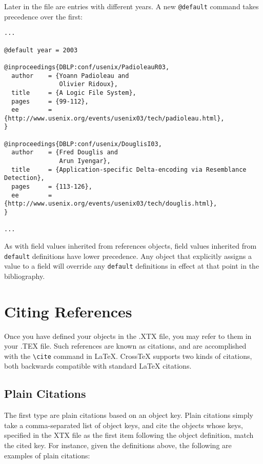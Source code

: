 \documentclass{article}
\newcommand{\XTeX}{Cross\TeX}
\begin{document}
Later in the file are entries with different years. A new \texttt{@default} command takes precedence over the first:

\begin{small}\begin{verbatim}
...

@default year = 2003

@inproceedings{DBLP:conf/usenix/PadioleauR03,
  author    = {Yoann Padioleau and
               Olivier Ridoux},
  title     = {A Logic File System},
  pages     = {99-112},
  ee        = {http://www.usenix.org/events/usenix03/tech/padioleau.html},
}

@inproceedings{DBLP:conf/usenix/DouglisI03,
  author    = {Fred Douglis and
               Arun Iyengar},
  title     = {Application-specific Delta-encoding via Resemblance Detection},
  pages     = {113-126},
  ee        = {http://www.usenix.org/events/usenix03/tech/douglis.html},
}

...
\end{verbatim}\end{small}

As with field values inherited from references objects, field values
inherited from \texttt{default} definitions have lower precedence. Any
object that explicitly assigns a value to a field will override any 
\texttt{default} definitions in effect at that point in the bibliography.


\section{Citing References}

Once you have defined your objects in the .XTX file, you may refer to them in your .TEX file. Such
references are known as citations, and are accomplished with the \verb"\cite" command in LaTeX. 
\XTeX{} supports two kinds of citations, both backwards compatible with standard LaTeX citations.

\subsection{Plain Citations}

The first type are plain citations based on an object key. Plain citations simply take a comma-separated
list of object keys, and cite the objects whose keys, specified in the XTX file as the first item 
following the object definition, match the cited key. For instance, given the definitions
above, the following are examples of plain citations:
\end{document}
